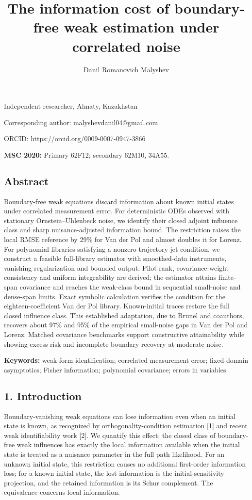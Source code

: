 \documentclass[
  american,
  11pt,
]{article}
\title{The information cost of boundary-free weak estimation under
correlated noise}
\author{Danil Romanovich Malyshev}
\date{}
\begin{document}
\maketitle

Independent researcher, Almaty, Kazakhstan

Corresponding author: malyshevdanil04@gmail.com

ORCID: https://orcid.org/0009-0007-0947-3866

\textbf{MSC 2020:} Primary 62F12; secondary 62M10, 34A55.

\subsection{Abstract}\label{abstract}

Boundary-free weak equations discard information about known initial
states under correlated measurement error. For deterministic ODEs
observed with stationary Ornstein--Uhlenbeck noise, we identify their
closed adjoint influence class and sharp nuisance-adjusted information
bound. The restriction raises the local RMSE reference by 29\% for Van
der Pol and almost doubles it for Lorenz. For polynomial libraries
satisfying a nonzero trajectory-jet condition, we construct a feasible
full-library estimator with smoothed-data instruments, vanishing
regularization and bounded output. Pilot rank, covariance-weight
consistency and uniform integrability are derived; the estimator attains
finite-span covariance and reaches the weak-class bound in sequential
small-noise and dense-span limits. Exact symbolic calculation verifies
the condition for the eighteen-coefficient Van der Pol library.
Known-initial traces restore the full closed influence class. This
established adaptation, due to Brunel and coauthors, recovers about 97\%
and 95\% of the empirical small-noise gaps in Van der Pol and Lorenz.
Matched covariance benchmarks support constructive attainability while
showing excess risk and incomplete boundary recovery at moderate noise.

\textbf{Keywords:} weak-form identification; correlated measurement
error; fixed-domain asymptotics; Fisher information; polynomial
covariance; errors in variables.

\subsection{1. Introduction}\label{introduction}

Boundary-vanishing weak equations can lose information even when an
initial state is known, as recognized by orthogonality-condition
estimation {[}1{]} and recent weak identifiability work {[}2{]}. We
quantify this effect: the closed class of boundary-free weak influences
has exactly the local information available when the initial state is
treated as a nuisance parameter in the full path likelihood. For an
unknown initial state, this restriction causes no additional first-order
information loss; for a known initial state, the lost information is the
initial-sensitivity projection, and the retained information is its
Schur complement. The equivalence concerns local information.
\end{document}
